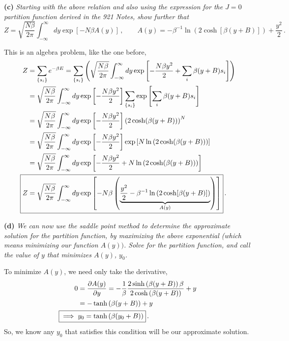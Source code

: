 \documentclass[10pt]{article}
\begin{document}
\textbf{(c)} \textit{Starting with the above relation and also using the expression for the $J = 0$ partition function derived in the 921 Notes, show further that}
\[
Z = \sqrt{\frac{N\beta}{2\pi}}\int_{-\infty}^{\infty}dy\exp[-N\beta A(y)]\, , \hspace{2em} A(y) = -\beta^{-1}\ln\left(2\cosh[\beta(y+B)]\right) + \frac{y^{2}}{2}\, .
\]

This is an algebra problem, like the one before,
\begin{align*}
  Z & = \sum_{\{s_{i}\}}e^{-\beta E} = \sum_{\{s_{i}\}}\left(\sqrt{\frac{N\beta}{2\pi}}\int_{-\infty}^{\infty}dy\exp\left[-\frac{N\beta y^{2}}{2} + \sum_{i}\beta(y + B)s_{i}\right]\right) \\
  & = \sqrt{\frac{N\beta}{2\pi}}\int_{-\infty}^{\infty}dy\exp\left[-\frac{N\beta y^{2}}{2}\right]\sum_{\{s_{i}\}}\exp\left[\sum_{i}\beta(y + B)s_{i}\right] \\
  & = \sqrt{\frac{N\beta}{2\pi}}\int_{-\infty}^{\infty}dy\exp\left[-\frac{N\beta y^{2}}{2}\right]\left(2\cosh(\beta(y + B))\right)^{N} \\
  & = \sqrt{\frac{N\beta}{2\pi}}\int_{-\infty}^{\infty}dy\exp\left[-\frac{N\beta y^{2}}{2}\right]\exp\left[N\ln\left(2\cosh(\beta(y + B))\right)\right] \\
  & = \sqrt{\frac{N\beta}{2\pi}}\int_{-\infty}^{\infty}dy\exp\left[-\frac{N\beta y^{2}}{2} + N\ln\left(2\cosh(\beta(y + B))\right)\right] \\
  \Aboxed{Z & = \sqrt{\frac{N\beta}{2\pi}}\int_{-\infty}^{\infty}dy\exp\left[-N\beta\left(\underbrace{\frac{y^{2}}{2} - \beta^{-1}\ln\left(2\cosh[\beta(y+B)]\right)}_{A(y)}\right)\right]}\, .
\end{align*}

\textbf{(d)} \textit{We can now use the saddle point method to determine the approximate solution for the partition function, by maximizing the above exponential (which means minimizing our function $A(y))$. Solve for the partition function, and call the value of $y$ that minimizes $A(y)$, $y_{0}$.}

To minimize $A(y)$, we need only take the derivative,
\begin{align*}
  0 & = \frac{\partial A(y)}{\partial y} = -\frac{1}{\beta}\frac{2\sinh\left(\beta(y + B)\right)\beta}{2\cosh\left(\beta(y + B)\right)} + y\\
  & = -\tanh\left(\beta(y + B)\right) + y \\
  \Aboxed{\implies & y_{0} = \tanh\left(\beta(y_{0} + B)\right) }\, .
\end{align*}
So, we know any $y_{0}$ that satisfies this condition will be our approximate solution.
\end{document}
